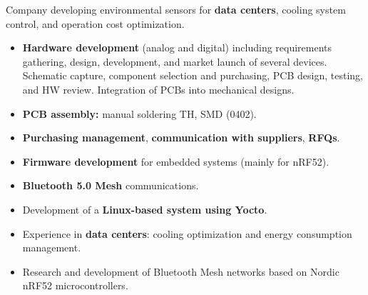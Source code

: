 \documentclass[10pt,a4paper,ragged2e,withhyper]{altacv}
\begin{document}
\begin{paracol}{2}


Company developing environmental sensors for \textbf{data centers}, cooling system control, and operation cost optimization.

\begin{itemize}
    \item \textbf{Hardware development} (analog and digital) including requirements gathering, design, development, and market launch of several devices. Schematic capture, component selection and purchasing, PCB design, testing, and HW review. Integration of PCBs into mechanical designs.
    \item \textbf{PCB assembly:} manual soldering TH, SMD (0402).
    \item \textbf{Purchasing management}, \textbf{communication with suppliers}, \textbf{RFQs}.
    \item \textbf{Firmware development} for embedded systems (mainly for nRF52).
    \item \textbf{Bluetooth 5.0 Mesh} communications.
    \item Development of a \textbf{Linux-based system using Yocto}.
    \item Experience in \textbf{data centers}: cooling optimization and energy consumption management.
\end{itemize}

\divider

\begin{itemize}
    \item Research and development of Bluetooth Mesh networks based on Nordic nRF52 microcontrollers.
\end{itemize}





\end{paracol}
\end{document}
